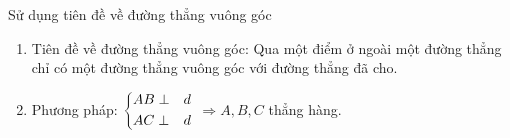 \begin{dang}{Sử dụng tiên đề về đường thẳng vuông góc}
	\begin{enumerate}[-]
		\item Tiên đề về đường thẳng vuông góc: Qua một điểm ở ngoài một đường thẳng chỉ có một đường thẳng vuông góc với đường thẳng đã cho.
		\item Phương pháp:
		{ $\left\{\begin{aligned}& AB \perp &d \\ & AC  \perp &d \end{aligned}\right.$ $\Rightarrow A, B, C$ thẳng hàng.}
\end{enumerate}\end{dang}

